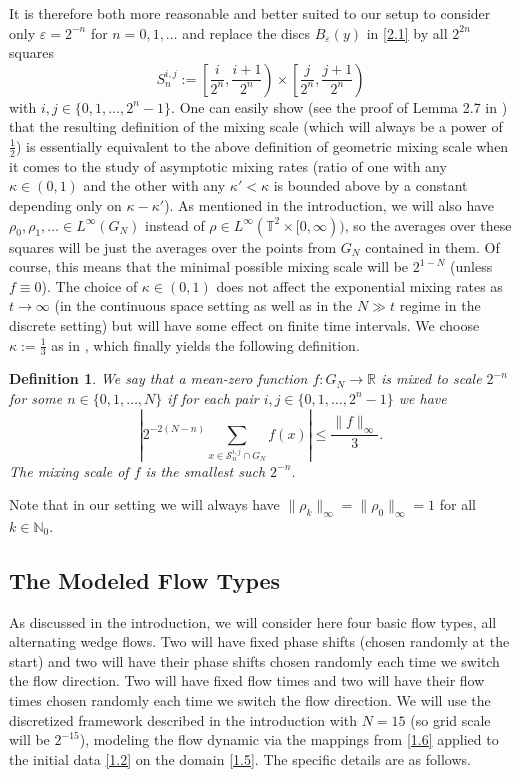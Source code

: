 \documentclass[12pt]{article}
\newtheorem{definition}{Definition}
\numberwithin{figure}{section}
\newcommand{\bde}{\begin{definition}}
\newcommand{\ede}{\end{definition}}
\numberwithin{equation}{section}
\newcommand{\lb}{\label}
\newcommand{\eps}{\varepsilon}
\newcommand{\bbN}{{\mathbb{N}}}
\newcommand{\bbR}{{\mathbb{R}}}
\newcommand{\bbT}{{\mathbb{T}}}
\begin{document}
It is therefore both more reasonable and better suited to our setup to consider only $\eps=2^{-n}$ for $n=0,1,\dots$ and replace the discs $B_\eps(y)$ in \eqref{2.1} by all $2^{2n}$ squares
\[
S_n^{i,j} := \left[\frac{i}{2^n},\frac{i+1}{2^n}\right)\times\left[\frac{j}{2^n},\frac{j+1}{2^n}\right)
\]  
with $i,j\in \{0,1,\dots,2^{n}-1\}$.
One can easily show (see the proof of Lemma 2.7 in \cite{ElgZla}) that the resulting definition of the mixing scale (which will always be a power of $\frac 12$) is essentially equivalent to the above definition of geometric mixing scale when it comes to the study of asymptotic mixing rates (ratio of one with any $\kappa\in(0,1)$ and the other with any $\kappa'<\kappa$ is bounded above by a constant depending only on $\kappa-\kappa'$).  As mentioned in the introduction, we will also have $\rho_0,\rho_1,\dots\in L^\infty(G_N)$ instead of $\rho\in L^\infty(\bbT^2\times[0,\infty))$, so the averages over these squares will be just the averages over the points from $G_N$ contained in them.  Of course, this means that  the minimal possible mixing scale will be $2^{1-N}$ (unless $f\equiv 0$).
The choice of $\kappa\in(0,1)$ does not affect the exponential mixing rates as $t\to\infty$ (in the continuous space setting as well as in the $N\gg t$ regime in the discrete setting) but will have some effect on finite time intervals.  We choose $\kappa:=\frac 13$ as in \cite{Bressan}, which finally yields the following definition.

\bde \lb{D.2.1}
We say that a mean-zero function $f:G_N\to\bbR$ is {\it mixed to scale} $2^{-n}$ for some $n\in\{0,1,\dots,N\}$ if for each pair $i,j\in \{0,1,\dots,2^{n}-1\}$ we have
\[
\left| {2^{-2(N-n)}}\sum_{x\in\mathcal{S}_n^{i,j}\cap G_N} f(x)\right| \leq \frac{\| f\|_\infty}{3}.
\]
The {\it mixing scale} of $f$ is the smallest such $2^{-n}$.
\ede

Note that in our setting we will always have $\|\rho_k\|_\infty=\|\rho_0\|_\infty = 1$ for all $k\in \bbN_0$.

\subsection{The Modeled Flow Types}
\label{S2.2}


As discussed in the introduction, we will consider here four basic flow types, all alternating wedge flows.  Two will have fixed phase shifts (chosen randomly at the start) and two will have their phase shifts chosen randomly each time we switch the flow direction.  Two will have fixed flow times and two will have their  flow times chosen randomly each time we switch the flow direction. We will use the discretized framework described in the introduction with $N=15$ (so grid scale will be $2^{-15}$), modeling the flow dynamic via the mappings from \eqref{1.6} applied to the initial data \eqref{1.2} on the domain \eqref{1.5}.  The specific details are as follows.
\end{document}
